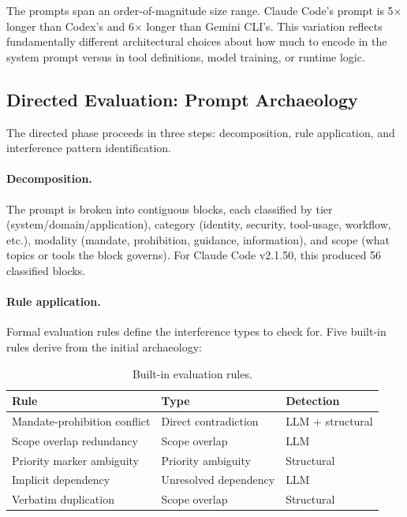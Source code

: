 \documentclass[11pt,a4paper]{article}
\begin{document}
The prompts span an order-of-magnitude size range. Claude Code's prompt
is 5$\times$ longer than Codex's and 6$\times$ longer than Gemini
CLI's. This variation reflects fundamentally different architectural
choices about how much to encode in the system prompt versus in tool
definitions, model training, or runtime logic.


\subsection{Directed Evaluation: Prompt Archaeology}
\label{sec:directed}

The directed phase proceeds in three steps: decomposition, rule
application, and interference pattern identification.

\paragraph{Decomposition.} The prompt is broken into contiguous blocks,
each classified by tier (system/domain/application), category
(identity, security, tool-usage, workflow, etc.), modality (mandate,
prohibition, guidance, information), and scope (what topics or tools
the block governs). For Claude Code v2.1.50, this produced 56
classified blocks.

\paragraph{Rule application.} Formal evaluation rules define the
interference types to check for. Five built-in rules derive from the
initial archaeology:

\begin{table}[H]
\centering
\caption{Built-in evaluation rules.}
\label{tab:rules}
\begin{tabular}{@{}lll@{}}
\toprule
Rule & Type & Detection \\
\midrule
Mandate-prohibition conflict & Direct contradiction & LLM + structural \\
Scope overlap redundancy & Scope overlap & LLM \\
Priority marker ambiguity & Priority ambiguity & Structural \\
Implicit dependency & Unresolved dependency & LLM \\
Verbatim duplication & Scope overlap & Structural \\
\bottomrule
\end{tabular}
\end{table}
\end{document}
